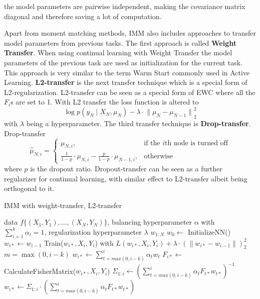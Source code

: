the model parameters are pairwise independent, making the covariance matrix diagonal and therefore saving a lot of computation. \par
Apart from moment matching methods, IMM also includes approaches to transfer model parameters from previous tasks. The first approach is called
\textbf{Weight Transfer}. When using continual learning with Weight Transfer the model parameters of the previous task are used as initialization for the
current task. This approach is very similar to the term Warm Start commonly used in Active Learning. \textbf{L2-transfer} is the next transfer technique
which is a special form of L2-regularization. L2-transfer can be seen as a special form of EWC where all the $F_i$s are set to 1. With L2 transfer the loss
function is altered to 
\begin{equation}
    \log p(y_N \mid X_N, \mu_N) - \lambda \cdot {\lVert \mu_N - \mu_{N-1} \rVert}^2_2
\end{equation}
with $\lambda$ being a hyperparameter. The third transfer technique is \textbf{Drop-transfer}. Drop-transfer
\begin{equation}
    \hat{\mu}_{N,i} = \begin{cases} \mu_{N,i}, & \text{if the }i \text{th node is turned off} \\
    \frac{1}{1-p} \cdot \mu_{N,i} - \frac{p}{1-p} \cdot \mu_{N-1,i}, & \text{otherwise}  \end{cases}
\end{equation}
where $p$ is the dropout ratio. Dropout-transfer can be seen as a further regularizer for continual learning, with similar effect to L2-transfer albeit
being orthogonal to it.
\begin{algorithm}
    \caption{IMM with weight-transfer, L2-transfer} \label{alg:IMM}
    \begin{algorithmic}
        \Require data $f\{ (X_1,Y_1),\ldots,(X_N,Y_N)\}$, balancing hyperparameter $\alpha$ with $\sum_{i=1}^k \alpha_i = 1$,
        regularization hyperparameter $\lambda$
        \return $w_{1:N}$
        \State $w_0 \leftarrow $ InitializeNN()
            \State $w_{i*} \leftarrow w_{i-1}$
            \State Train($w_{i*},X_i,Y_i$) with $L(w_{i*},X_i,Y_i) + \lambda \cdot (\lVert w_{i*} - w_{i-1} \rVert)^2_2$
            \State $m=\max (0,i-k)$
            \State $w_{i*} \leftarrow \sum_{t=max(0,i-k)}^i \alpha_t w_{t}$
            \State $F_{i*} \leftarrow$ CalculateFisherMatrix($w_{i*},X_i,Y_i$)
            \State $\Sigma_{1:i} \leftarrow (\sum_{t=max(0,i-k)}^i \alpha_t F_{t*} w_{t*})^{-1}$
            \State $w_{i*} \leftarrow \Sigma_{1:i} \cdot (\sum_{t=max(0,i-k)}^i \alpha_t F_{t*} w_{t*})$
            \EndIf
        \EndFor
    \end{algorithmic}
\end{algorithm}

